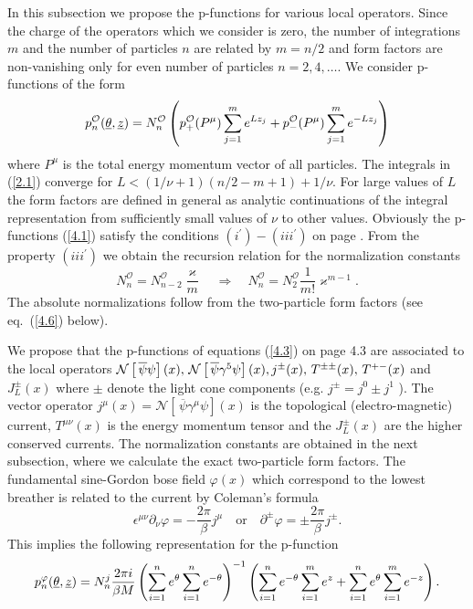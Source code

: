 \documentclass[a4paper,a4paper]{article}
\begin{document}
\label{s41}

In this subsection we propose the p-functions for various local operators.
Since the charge of the operators which we consider is zero, the number of
integrations $m$ and the number of particles $n$ are related by $m=n/2$ and
form factors are non-vanishing only for even number of particles $%
n=2,4,\dots $. We consider p-functions of the form 
\begin{equation}
p_{n}^{\mathcal{O}}(\underline{\theta },{\underline{z}})=N_{n}^{\mathcal{O}%
}\left( p_{+}^{\mathcal{O}}(P^{\mu })\sum_{j=1}^{m}e^{Lz_{j}}+p_{-}^{%
\mathcal{O}}(P^{\mu })\sum_{j=1}^{m}e^{-Lz_{j}}\right)  \label{4.1}
\end{equation}
where $P^{\mu }$ is the total energy momentum vector of all particles. The
integrals in (\ref{2.1}) converge for $L<(1/\nu +1)(n/2-m+1)+1/\nu $. For
large values of $L$ the form factors are defined in general as analytic
continuations of the integral representation from sufficiently small values
of $\nu $ to other values. Obviously the p-functions (\ref{4.1}) satisfy the
conditions $(i^{\prime })-(iii^{\prime })$ on page \pageref{p}. From the
property $(iii^{\prime })$ we obtain the recursion relation for the
normalization constants 
\begin{equation}
N_{n}^{\mathcal{O}}=N_{n-2}^{\mathcal{O}}\frac{\varkappa }{m}\quad
\Rightarrow \quad N_{n}^{\mathcal{O}}=N_{2}^{\mathcal{O}}\frac{1}{m!}%
\varkappa ^{m-1}.  \label{4.2}
\end{equation}
The absolute normalizations follow from the two-particle form factors (see
eq.~(\ref{4.6}) below).

We propose that the p-functions of equations (\ref{4.3}) on page \pageref
{4.3} are associated to the local operators $\mathcal{N}\left[ \,\overline{%
\psi }\psi \right] (x),\,\mathcal{N}\left[ \,\overline{\psi }\gamma ^{5}\psi
\right] (x),j^{\pm }(x),\,T^{\pm \pm }(x),\,T^{+-}(x)$ and $J_{L}^{\pm }(x)$
where $\pm $ denote the light cone components (e.g. $j^{\pm }=j^{0}\pm j^{1}$%
). The vector operator $j^{\mu }(x)=\mathcal{N}\left[ \,\overline{\psi }%
\gamma ^{\mu }\psi \right] (x)$ is the topological (electro-magnetic)
current, $T^{\mu \nu }(x)$ is the energy momentum tensor and the $J_{L}^{\pm
}(x)$ are the higher conserved currents. The normalization constants are
obtained in the next subsection, where we calculate the exact two-particle
form factors. The fundamental sine-Gordon bose field $\varphi (x)$ which
correspond to the lowest breather is related to the current by Coleman's
formula \cite{Co} 
\begin{equation}
\epsilon ^{\mu \nu }\partial _{\nu }\varphi =-\frac{2\pi }{\beta }j^{\mu
}\quad \text{or}\quad \partial ^{\pm }\varphi =\pm \frac{2\pi }{\beta }%
j^{\pm }.  \label{4.4}
\end{equation}
This implies the following representation for the p-function 
\[
p_{n}^{\varphi }(\underline{\theta },\underline{z})=N_{n}^{j}\frac{2\pi i}{%
\beta M}\left( \sum_{i=1}^{n}e^{\theta }\sum_{i=1}^{n}e^{-\theta }\right)
^{-1}\left( \sum_{i=1}^{n}e^{-\theta
}\sum_{i=1}^{m}e^{z}+\sum_{i=1}^{n}e^{\theta }\sum_{i=1}^{m}e^{-z}\right) . 
\]
\end{document}
